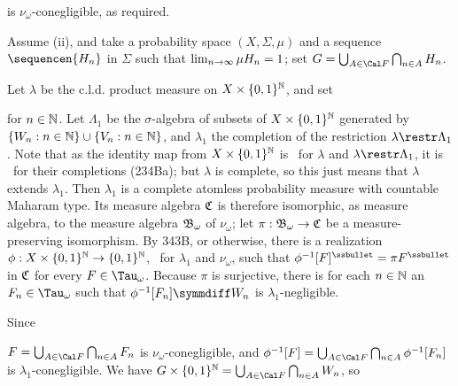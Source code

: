 {

\noindent is $\nu_{\omega}$-conegligible, as required.

\medskip

 Assume (ii), and take a probability space
$(X,\Sigma,\mu)$ and a sequence $\sequencen{H_n}$ in $\Sigma$ such that
$\lim_{n\to\infty}\mu H_n\penalty-50=1$;  set
$G=\bigcup_{A\in\Cal F}\bigcap_{n\in A}H_n$.

Let $\lambda$ be the c.l.d. product
measure on $X\times\{0,1\}^{\Bbb N}$, and set


\noindent for $n\in\Bbb N$.   Let $\Lambda_1$ be the $\sigma$-algebra of
subsets of $X\times\{0,1\}^{\Bbb N}$ generated by
$\{W_n:n\in\Bbb N\}\cup\{V_n:n\in\Bbb N\}$, and $\lambda_1$ the completion
of the restriction $\lambda\restr\Lambda_1$.   Note that as the identity
map from $X\times\{0,1\}^{\Bbb N}$ is \imp\ for $\lambda$ and
$\lambda\restr\Lambda_1$, it is \imp\ for their completions
(234Ba);  but
$\lambda$ is complete, so this just means that $\lambda$ extends
$\lambda_1$.   Then $\lambda_1$ is a complete
atomless probability measure with countable Maharam type.   Its measure
algebra $\frak C$ is therefore isomorphic, as measure algebra, to the
measure algebra $\frak B_{\omega}$ of $\nu_{\omega}$;  let
$\pi:\frak B_{\omega}\to\frak C$ be a measure-preserving isomorphism.
By 343B, or otherwise, there is a realization
$\phi:X\times\{0,1\}^{\Bbb N}\to\{0,1\}^{\Bbb N}$,
\imp\ for $\lambda_1$ and $\nu_{\omega}$, such that
$\phi^{-1}[F]^{\ssbullet}=\pi F^{\ssbullet}$ in $\frak C$ for every
$F\in\Tau_{\omega}$.   Because $\pi$ is surjective, there is for each
$n\in\Bbb N$ an $F_n\in\Tau_{\omega}$ such that
$\phi^{-1}[F_n]\symmdiff W_n$ is $\lambda_1$-negligible.

Since


\noindent $F=\bigcup_{A\in\Cal F}\bigcap_{n\in A}F_n$ is
$\nu_{\omega}$-conegligible, and
$\phi^{-1}[F]=\bigcup_{A\in\Cal F}\bigcap_{n\in A}\phi^{-1}[F_n]$ is
$\lambda_1$-conegligible.   We have
$G\times\{0,1\}^{\Bbb N}=\bigcup_{A\in\Cal F}\bigcap_{n\in A}W_n$,
so

}
